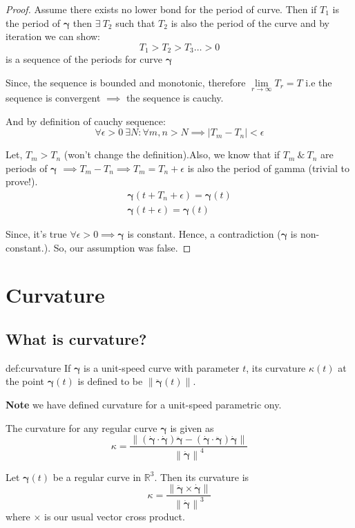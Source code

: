 \documentclass{notes}
\newcommand{\norm}[1]{\left\lVert #1 \right \rVert}
\newcommand{\abs}[1]{\left| #1 \right|}
\newcommand{\bgamma}{\bm{\gamma}}
\begin{document}
\begin{proof}
	Assume there exists no lower bond for the period of curve. 
	Then if \(T_1\) is the period of \(\bgamma\) then \(\exists\  T_2\) such that \(T_2\) is also the period of the curve and by iteration we can show:
	\[T_1 > T_2 > T_3 \ldots >0\]
	is a sequence of the periods for curve \(\bgamma\)
	
Since, the sequence is bounded and monotonic, therefore \(\lim\limits_{r \to \infty} T_r = T\) i.e the sequence is convergent \(\implies\) the sequence is cauchy.

And by definition of cauchy sequence:
\[\forall \epsilon > 0\ \exists N : \forall m, n> N \implies \abs{T_m -T_n} < \epsilon\]

Let, \(T_m > T_n\) (won't change the definition).Also, we know that if \(T_m \ \& \ T_n\) are periods of \(\bgamma\) \(\implies T_m - T_n \implies T_m = T_n + \epsilon\)  is also the period of gamma (trivial to prove!). 
\[
\begin{gathered}
	\bgamma(t + T_n + \epsilon) = \bgamma(t) \\
	\bgamma(t + \epsilon) = \bgamma(t)
\end{gathered}
\]

Since, it's true \(\forall \epsilon > 0 \implies \bgamma\) is constant. 
Hence, a contradiction (\(\bgamma\) is non-constant.). So, our assumption was false.
\end{proof}

\chapter{Curvature}

\section{What is curvature?}
\begin{definition}[Curvature]{def:curvature}
	If \(\bm{\gamma}\) is a unit-speed curve with parameter \(t\), its curvature \(\kappa(t)\) at the point \(\bm{\gamma}(t)\)
	is defined to be \(\norm{\ddot{\bm{\gamma}}(t)}\).
	
\textbf{Note} we have defined curvature for a unit-speed parametric ony.
\end{definition}
\begin{theorem}{1}
	The curvature for any regular curve \(\bm{\gamma}\) is given as
	\[\kappa = \dfrac{\norm{ (\dot{\bm{\gamma}}\cdot\dot{\bm{\gamma}}) \ddot{\bm{\gamma}} - (\dot{\bm{\gamma}}\cdot\ddot{\bm{\gamma}}) \dot{\bm{\gamma}}}}{\norm{\dot{\bm{\gamma}}}^4} \]
 \end{theorem}
\begin{proposition}{1}
	Let \(\bm{\gamma}(t)\) be a regular curve in \(\mathbb{R}^3\). Then its curvature is 
	\[\kappa = \dfrac{\norm{\ddot{\bm{\gamma}} \times \dot{\bm{\gamma}}}}{\norm{\dot{\bm{\gamma}}}^3}\]
	where \(\times\) is our usual vector cross product.
\end{proposition}
\end{document}
